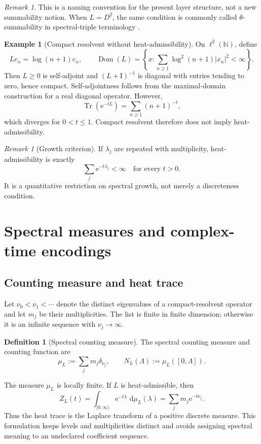 \documentclass[11pt,a4paper]{article}
\theoremstyle{definition}
\newtheorem{definition}[theorem]{Definition}
\newtheorem{example}[theorem]{Example}
\theoremstyle{remark}
\newtheorem{remark}[theorem]{Remark}
\newcommand{\N}{\mathbb N}
\newcommand{\Tr}{\operatorname{Tr}}
\newcommand{\Dom}{\operatorname{Dom}}
\newcommand{\Id}{\mathrm I}
\newcommand{\e}{\mathrm e}
\newcommand{\dd}{\,\mathrm d}
\newcommand{\abs}[1]{\left\lvert #1\right\rvert}
\newcommand{\set}[1]{\left\{#1\right\}}
\begin{document}
\begin{remark}
This is a naming convention for the present layer structure, not a new
summability notion. When \(L=D^2\), the same condition is commonly called
\(\theta\)-summability in spectral-triple terminology
\cite{Connes1994,SimonTrace}.
\end{remark}

\begin{example}[Compact resolvent without heat-admissibility]
\label{ex:log-spectrum}
On \(\ell^2(\N)\), define
\[
  Le_n=\log(n+1)e_n,\qquad
  \Dom(L)=
  \set{x:\sum_{n\geq1}\log^2(n+1)\abs{x_n}^2<\infty}.
\]
Then \(L\geq0\) is self-adjoint and
\((L+\Id)^{-1}\) is diagonal with entries tending to zero, hence compact.
Self-adjointness follows from the maximal-domain construction for a real
diagonal operator.
However,
\[
 \Tr(\e^{-tL})=\sum_{n\geq1}(n+1)^{-t},
\]
which diverges for \(0<t\leq1\). Compact resolvent therefore does not imply
heat-admissibility.
\end{example}

\begin{remark}[Growth criterion]
If \(\lambda_j\) are repeated with multiplicity, heat-admissibility is exactly
\[
  \sum_j\e^{-t\lambda_j}<\infty
  \quad\text{for every }t>0.
\]
It is a quantitative restriction on spectral growth, not merely a discreteness
condition.
\end{remark}

\section{Spectral measures and complex-time encodings}

\subsection{Counting measure and heat trace}

Let \(\nu_0<\nu_1<\cdots\) denote the distinct eigenvalues of a
compact-resolvent operator and let \(m_j\) be their multiplicities. The list is
finite in finite dimension; otherwise it is an infinite sequence with
\(\nu_j\to\infty\).

\begin{definition}[Spectral counting measure]
The spectral counting measure and counting function are
\[
  \mu_L:=\sum_jm_j\delta_{\nu_j},
  \qquad
  N_L(\Lambda):=\mu_L([0,\Lambda]).
\]
\end{definition}

The measure \(\mu_L\) is locally finite. If \(L\) is heat-admissible, then
\[
 Z_L(t)=\int_{[0,\infty)}\e^{-t\lambda}\,\dd\mu_L(\lambda)
       =\sum_jm_j\e^{-t\nu_j}.
\]
Thus the heat trace is the Laplace transform of a positive discrete measure.
This formulation keeps levels and multiplicities distinct and avoids assigning
spectral meaning to an undeclared coefficient sequence.
\end{document}

